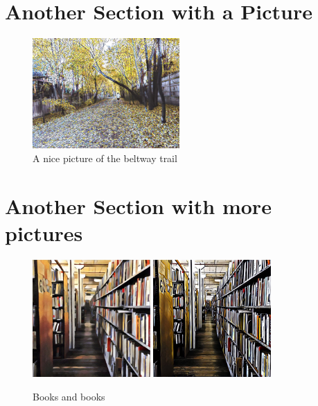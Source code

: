 \documentclass[11pt,letterpaper,twoside]{book}
\begin{document}
\section{Another Section with a Picture}

\lipsum[89-93]
\begin{figure}
\centering
\includegraphics[width=0.5\textwidth]{TrailPic1}
\caption{\label{fig:path}A nice picture of the beltway trail}
\end{figure}

\lipsum[10-11]

\section{Another Section with more pictures}

\lipsum[12]

\begin{figure}
\centering
\includegraphics[width=0.4\textwidth]{BooksPic1}
\qquad
\includegraphics[width=0.4\textwidth]{BooksPic2}
\caption{\label{fig:path}Books and books}
\end{figure}
\end{document}
